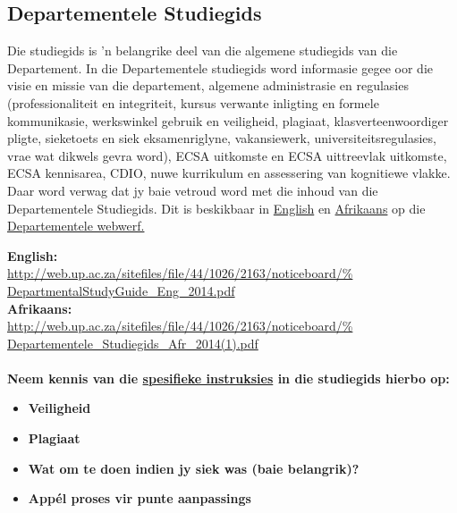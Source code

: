    \subsection{Departementele Studiegids}
    Die studiegids is 'n belangrike deel van die algemene studiegids
    van die Departement. In die Departementele studiegids word
    informasie gegee oor die visie en missie van die departement,
    algemene administrasie en regulasies (professionaliteit en
    integriteit, kursus verwante inligting en formele kommunikasie,
    werkswinkel gebruik en veiligheid, plagiaat, klasverteenwoordiger
    pligte, sieketoets en siek eksamenriglyne, vakansiewerk,
    universiteitsregulasies, vrae wat dikwels gevra word), ECSA
    uitkomste en ECSA uittreevlak uitkomste, ECSA kennisarea, CDIO,
    nuwe kurrikulum en assessering van kognitiewe vlakke.  Daar word
    verwag dat jy baie vetroud word met die inhoud van die
    Departementele Studiegids.  Dit is beskikbaar in 
\href{http://web.up.ac.za/sitefiles/file/44/1026/2163/noticeboard/%
        DepartmentalStudyGuide\_Eng\_2014.pdf}{English}
    en
    \href{http://web.up.ac.za/sitefiles/file/44/1026/2163/noticeboard/%
        Departementele\_Studiegids\_Afr\_2014(1).pdf}{Afrikaans}
    op die
    \href{http://web.up.ac.za/default.asp?ipkCategoryID=11426&%
        subid=11426&ipklookid=7}{Departementele webwerf.}

    \noindent
    \textbf{English:} \\
    \url{http://web.up.ac.za/sitefiles/file/44/1026/2163/noticeboard/%
        DepartmentalStudyGuide\_Eng\_2014.pdf} \\
    \textbf{Afrikaans:} \\
    \url{http://web.up.ac.za/sitefiles/file/44/1026/2163/noticeboard/%
        Departementele\_Studiegids\_Afr\_2014(1).pdf} \\~\\

    \noindent
    \textbf{Neem kennis van die \uline{spesifieke instruksies} in die
      studiegids hierbo op:}
    \begin{itemize}
        \item \textbf{Veiligheid}
        \item \textbf{Plagiaat}
        \item \textbf{Wat om te doen indien jy siek was (baie belangrik)?}
        \item \textbf{App\'el proses vir punte aanpassings}
    \end{itemize}